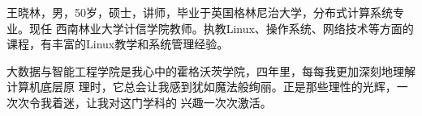 \documentclass{swfuthesis}
\begin{document}
\tableofcontents     %
\listoffigures       %
\listoftables        %
\cleardoublepage %


\appendix %
\makebib %

\begin{advisorInfo} %
  王晓林，男，50岁，硕士，讲师，毕业于英国格林尼治大学，分布式计算系统专业。现任
  西南林业大学计信学院教师。执教Linux、操作系统、网络技术等方面的课程，有丰富的Linux教学和系统管理经验。
\end{advisorInfo}

\begin{acknowledgment} %
   大数据与智能工程学院是我心中的霍格沃茨学院，四年里，每每我更加深刻地理解计算机底层原
 理时，它总会让我感到犹如魔法般绚丽。正是那些理性的光辉，一次次令我着迷，让我对这门学科的
兴趣一次次激活。
\end{acknowledgment}

\singlespacing

\end{document}
